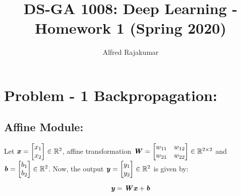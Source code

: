 \documentclass{article}
\title{DS-GA 1008: Deep Learning - Homework 1 (Spring 2020)}
\author{Alfred Rajakumar}
\begin{document}
\maketitle

\section{Problem - 1 Backpropagation:}
\subsection{Affine Module:}
Let  $\textbf{\textit{x}}=\begin{bmatrix}x_{1}\\x_{2}\end{bmatrix}\in\mathbb{R}^{2}$, affine transformation $\textbf{\textit{W}}=\begin{bmatrix}w_{11}&w_{12}\\w_{21}&w_{22}\end{bmatrix}\in\mathbb{R}^{2\times 2}$ and $\textbf{\textit{b}}=\begin{bmatrix}b_{1}\\b_{2}\end{bmatrix}\in\mathbb{R}^{2}$. Now, the output $\textbf{\textit{y}}=\begin{bmatrix}y_{1}\\y_{2}\end{bmatrix}\in\mathbb{R}^{2}$ is given by:

\begin{equation}
    \textbf{\textit{y}} = \textbf{\textit{W}}\textbf{\textit{x}} + \textbf{\textit{b}}
\end{equation}
\end{document}
